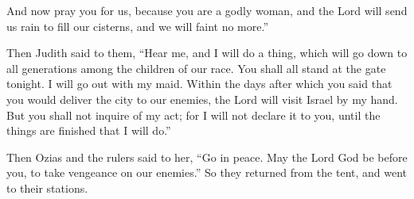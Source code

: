 {And now pray you for us, because you are a godly woman, and the Lord will send us rain to fill our cisterns, and we will faint no more.”
\par }{\PP {}Then Judith said to them, “Hear me, and I will do a thing, which will go down to all generations among the children of our race.
You shall all stand at the gate tonight. I will go out with my maid. Within the days after which you said that you would deliver the city to our enemies, the Lord will visit Israel by my hand.
But you shall not inquire of my act; for I will not declare it to you, until the things are finished that I will do.”
\par }{\PP {}Then Ozias and the rulers said to her, “Go in peace. May the Lord God be before you, to take vengeance on our enemies.”
So they returned from the tent, and went to their stations.

}

